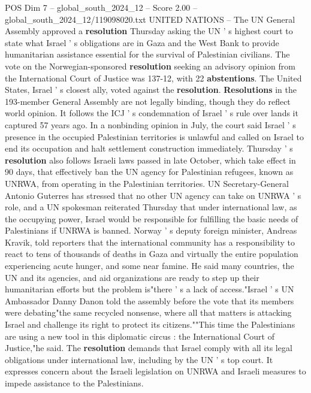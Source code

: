 \begin{textsample}{POS Dim 7 – global\_south\_2024\_12 – Score 2.00 – global\_south\_2024\_12/119098020.txt}  \label{ex:f7_pos_151}
UNITED NATIONS -- The UN General Assembly approved a \textbf{resolution} Thursday asking the UN ' s highest court to state what Israel ' s obligations are in Gaza and the West Bank to provide humanitarian assistance essential for the survival of Palestinian civilians.
The vote on the Norwegian-sponsored \textbf{resolution} seeking an advisory opinion from the International Court of Justice was 137-12, with 22 \textbf{abstentions}.
The United States, Israel ' s closest ally, voted against the \textbf{resolution}. \textbf{Resolutions} in the 193-member General Assembly are not legally binding, though they do reflect world opinion.
It follows the ICJ ' s condemnation of Israel ' s rule over lands it captured 57 years ago.
In a nonbinding opinion in July, the court said Israel ' s presence in the occupied Palestinian territories is unlawful and called on Israel to end its occupation and halt settlement construction immediately.
Thursday ' s \textbf{resolution} also follows Israeli laws passed in late October, which take effect in 90 days, that effectively ban the UN agency for Palestinian refugees, known as UNRWA, from operating in the Palestinian territories.
UN Secretary-General Antonio Guterres has stressed that no other UN agency can take on UNRWA ' s role, and a UN spokesman reiterated Thursday that under international law, as the occupying power, Israel would be responsible for fulfilling the basic needs of Palestinians if UNRWA is banned.
Norway ' s deputy foreign minister, Andreas Kravik, told reporters that the international community has a responsibility to react to tens of thousands of deaths in Gaza and virtually the entire population experiencing acute hunger, and some near famine.
He said many countries, the UN and its agencies, and aid organizations are ready to step up their humanitarian efforts but the problem is"there ' s a lack of access."Israel ' s UN Ambassador Danny Danon told the assembly before the vote that its members were debating"the same recycled nonsense, where all that matters is attacking Israel and challenge its right to protect its citizens.""This time the Palestinians are using a new tool in this diplomatic circus : the International Court of Justice,"he said.
The \textbf{resolution} demands that Israel comply with all its legal obligations under international law, including by the UN ' s top court.
It expresses concern about the Israeli legislation on UNRWA and Israeli measures to impede assistance to the Palestinians.

\end{textsample}
